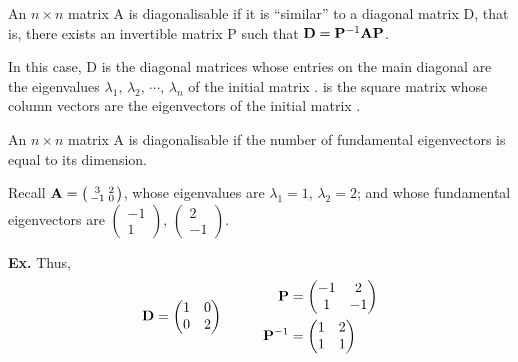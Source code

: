 

  An $n \times n$ matrix \matri A is diagonalisable if it is ``similar'' to a
  diagonal matrix \matri D, that is, there exists an invertible matrix \matri P such
  that $\mathbf{D} = \mathbf{P} ^{-1} \mathbf{AP}$. 

  In this case, \matri D is the diagonal
  matrices whose entries on the main diagonal are the eigenvalues $
  \lambda_1,\, \lambda_2,\, \cdots,\,\lambda_n$ of the initial matrix .  is the square matrix whose
  column vectors are the eigenvectors of the initial matrix .

  \begin{definition}
    An $n \times n$ matrix \matri A is diagonalisable if the number of
    fundamental eigenvectors is equal to its dimension.
  \end{definition}

  Recall $\mathbf{A} = \left(\begin{smallmatrix} 3 & 2\\-1 & 0\end{smallmatrix}\right)$, whose eigenvalues are
  $\lambda_1 = 1,\,\lambda_2 = 2$; and whose fundamental eigenvectors are
  $\left(\begin{smallmatrix} -1\\1
      \end{smallmatrix}\right),\,\left(\begin{smallmatrix}
  2\\-1\end{smallmatrix}\right)$.
 
  \textbf{Ex.} 
  Thus, 
  \begin{equation*}
    \begin{aligned}
      \mathbf{D} &= \begin{pmatrix} 1 & 0\\ 0 & 2 \end{pmatrix}
    \end{aligned}
    \qquad
    \begin{aligned}
    \mathbf{P} &= \begin{pmatrix} -1 & 2\\1 & -1 \end{pmatrix}\\
    \mathbf{P} ^{-1} &= \begin{pmatrix} 1 & 2\\1 & 1 \end{pmatrix}
    \end{aligned}
  \end{equation*}

